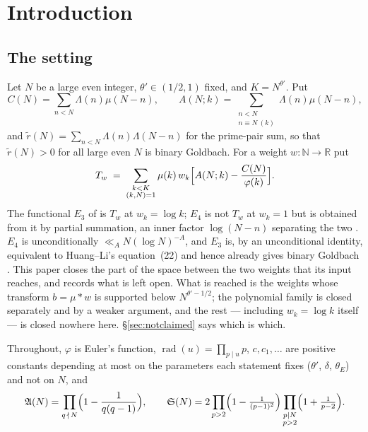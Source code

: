 \documentclass[11pt,a4paper]{article}
\theoremstyle{plain}
\theoremstyle{definition}
\theoremstyle{remark}
\renewcommand{\SS}{\mathfrak{S}}
\newcommand{\AAA}{\mathfrak{A}}
\DeclareMathOperator{\rad}{rad}
\begin{document}
\section{Introduction}

\subsection{The setting}

Let $N$ be a large even integer, $\theta'\in(1/2,1)$ fixed, and
$K=N^{\theta'}$. Put
\begin{equation}\label{eq:C}
  C(N)=\sum_{n<N}\Lambda(n)\mu(N-n),
  \qquad
  A(N;k)=\sum_{\substack{n<N\\ n\equiv N\ (k)}}\Lambda(n)\mu(N-n),
\end{equation}
and $\tilde r(N)=\sum_{n<N}\Lambda(n)\Lambda(N-n)$ for the prime-pair
sum, so that $\tilde r(N)>0$ for all large even $N$ is binary
Goldbach. For a weight $w:\mathbb N\to\mathbb R$ put
\begin{equation}\label{eq:Tw}
  T_w \;=\;\sum_{\substack{k<K\\ (k,N)=1}}\mu(k)\,w_k
     \Bigl[A(N;k)-\frac{C(N)}{\varphi(k)}\Bigr].
\end{equation}
The functional $E_3$ of \cite{HL} is $T_w$ at $w_k=\log k$; $E_4$ is
not $T_w$ at $w_k=1$ but is obtained from it by partial summation, an
inner factor $\log(N-n)$ separating the two \cite[Corollary on the collapse]{P1}. $E_4$ is
unconditionally $\ll_A N(\log N)^{-A}$, and $E_3$ is, by an
unconditional identity, equivalent to Huang--Li's equation~(22) and
hence already gives binary Goldbach \cite{P1}. This paper closes the
part of the space between the two weights that its input reaches, and
records what is left open. What is reached is the weights whose
transform $b=\mu*w$ is supported below $N^{\theta'-1/2}$; the
polynomial family is closed separately and by a weaker argument, and
the rest --- including $w_k=\log k$ itself --- is closed nowhere here.
\S\ref{sec:notclaimed} says which is which.

Throughout, $\varphi$ is Euler's function, $\rad(u)=\prod_{p\mid u}p$,
$c,c_1,\dots$ are positive constants depending at most on the
parameters each statement fixes ($\theta'$, $\delta$, $\theta_E$) and
not on $N$, and
\begin{equation}\label{eq:AN}
  \AAA(N)=\prod_{q\,\nmid\,N}\Bigl(1-\frac{1}{q(q-1)}\Bigr),
  \qquad
  \SS(N)=2\prod_{p>2}\Bigl(1-\tfrac{1}{(p-1)^2}\Bigr)
          \prod_{\substack{p\mid N\\ p>2}}\Bigl(1+\tfrac{1}{p-2}\Bigr).
\end{equation}
\end{document}
